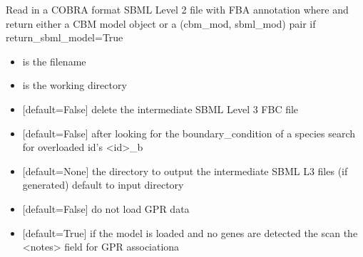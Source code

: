 \documentclass[letterpaper,10pt,english]{sphinxmanual}
\begin{document}
\begin{fulllineitems}
\label{\detokenize{modules_doc:cbmpy.CBRead.readCOBRASBML}}
\pysigstartsignatures
{}
\pysigstopsignatures
\sphinxAtStartPar
Read in a COBRA format SBML Level 2 file with FBA annotation where and return either a CBM model object
or a (cbm\_mod, sbml\_mod) pair if return\_sbml\_model=True
\begin{itemize}
\item {} 
\sphinxAtStartPar
{} is the filename

\item {} 
\sphinxAtStartPar
{} is the working directory

\item {} 
\sphinxAtStartPar
{} {[}default=False{]} delete the intermediate SBML Level 3 FBC file

\item {} 
\sphinxAtStartPar
{} {[}default=False{]} after looking for the boundary\_condition of a species search for overloaded id’s \textless{}id\textgreater{}\_b

\item {} 
\sphinxAtStartPar
{} {[}default=None{]} the directory to output the intermediate SBML L3 files (if generated) default to input directory

\item {} 
\sphinxAtStartPar
{} {[}default=False{]} do not load GPR data

\item {} 
\sphinxAtStartPar
{} {[}default=True{]} if the model is loaded and no genes are detected the scan the \textless{}notes\textgreater{} field for GPR associationa

\end{itemize}

\end{fulllineitems}
\end{document}
